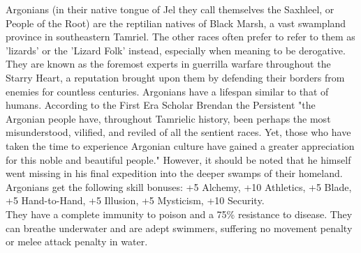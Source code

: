 \documentclass[12pt]{book}
\begin{document}
Argonians (in their native tongue of Jel they call themselves the Saxhleel, or People of the Root) are the reptilian natives of Black Marsh, a vast swampland province in southeastern Tamriel. The other races often prefer to refer to them as 'lizards' or the 'Lizard Folk' instead, especially when meaning to be derogative. They are known as the foremost experts in guerrilla warfare throughout the Starry Heart, a reputation brought upon them by defending their borders from enemies for countless centuries. Argonians have a lifespan similar to that of humans. According to the First Era Scholar Brendan the Persistent "the Argonian people have, throughout Tamrielic history, been perhaps the most misunderstood, vilified, and reviled of all the sentient races. Yet, those who have taken the time to experience Argonian culture have gained a greater appreciation for this noble and beautiful people." However, it should be noted that he himself went missing in his final expedition into the deeper swamps of their homeland.\\

Argonians get the following skill bonuses: +5 Alchemy, +10 Athletics, +5 Blade, +5 Hand-to-Hand, +5 Illusion, +5 Mysticism, +10 Security.\\

They have a complete immunity to poison and a 75\% resistance to disease. They can breathe underwater and are adept swimmers, suffering no movement penalty or melee attack penalty in water.
\end{document}
